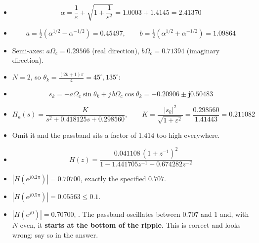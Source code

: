 \begin{itemize}
  \item[] \[ \alpha=\frac{1}{\varepsilon}+\sqrt{1+\frac{1}{\varepsilon^2}}
             =1.0003+1.4145=\mathbf{2.41370} \]
  \item[] \[ a=\tfrac12\!\left(\alpha^{1/2}-\alpha^{-1/2}\right)=\mathbf{0.45497},
             \qquad
             b=\tfrac12\!\left(\alpha^{1/2}+\alpha^{-1/2}\right)=\mathbf{1.09864} \]
  \item Semi-axes: $a\Omega_c=0.29566$ (real direction),
        $b\Omega_c=0.71394$ (imaginary direction). 
  \item $N=2$, so $\theta_k=\frac{(2k+1)\pi}{4}=45^\circ,135^\circ$:
  \item[] \[ s_k=-a\Omega_c\sin\theta_k+j\,b\Omega_c\cos\theta_k
             =\mathbf{-0.20906\pm j0.50483} \]
  \item[] \[ H_a(s)=\frac{K}{s^2+0.418125s+0.298560},\qquad
             K=\frac{|s_k|^2}{\sqrt{1+\varepsilon^2}}
              =\frac{0.298560}{1.41443}=\mathbf{0.211082} \]
  \item {} Omit it and the
        passband sits a factor of $1.414$ too high everywhere.
\end{itemize}

\begin{itemize}
  \item[] \[ \boxed{\,H(z)=\frac{0.041108\,(1+z^{-1})^2}
             {1-1.441705z^{-1}+0.674282z^{-2}}\,} \]
  \item $|H(e^{j0.2\pi})|=\mathbf{0.70700}$, exactly the specified $0.707$.
        \checkmark
  \item $|H(e^{j0.5\pi})|=\mathbf{0.05563}\le0.1$. \checkmark
  \item $|H(e^{j0})|=\mathbf{0.70700}$, . The passband oscillates between
        $0.707$ and $1$ and, with $N$ even, it \textbf{starts at the bottom of the
        ripple}. This is correct and looks wrong: say so in the answer.
\end{itemize}

